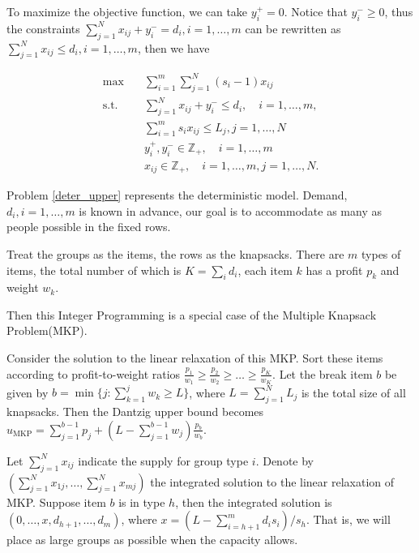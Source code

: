 To maximize the objective function, we can take $y_i^{+} = 0$. Notice that $y_{i}^{-} \geq 0$, thus the constraints $\sum_{j= 1}^{N} x_{ij} + y_{i}^{-} = d_{i}, i = 1,\ldots,m$ can be rewritten as $\sum_{j= 1}^{N} x_{ij} \leq d_{i}, i = 1,\ldots,m$, then we have

\begin{equation}\label{deter_upper}
  \begin{aligned}
  \max \quad & \sum_{i=1}^{m}  \sum_{j= 1}^{N} (s_i-1) x_{ij} \\
  \text {s.t.} \quad & \sum_{j= 1}^{N} x_{ij} + y_{i}^{-} \leq d_{i}, \quad i =1,\ldots,m, \\
  & \sum_{i=1}^{m} s_{i} x_{ij} \leq L_j, j =1,\ldots, N \\
  & y_{i}^{+}, y_{i}^{-} \in \mathbb{Z}_{+}, \quad i = 1,\ldots,m \\
  & x_{ij} \in \mathbb{Z}_{+}, \quad i=1,\ldots,m, j = 1,\ldots,N.
  \end{aligned}
\end{equation}

Problem \eqref{deter_upper} represents the deterministic model. Demand, $d_i, i = 1,\ldots,m$ is known in advance, our goal is to accommodate as many as people possible in the fixed rows.

Treat the groups as the items, the rows as the knapsacks. There are $m$ types of items, the total number of which is $K = \sum_{i} d_i$, each item $k$ has a profit $p_k$ and weight $w_k$. 


Then this Integer Programming is a special case of the Multiple Knapsack Problem(MKP). 

Consider the solution to the linear relaxation of this MKP. Sort these items according to profit-to-weight ratios $\frac{p_1}{w_1} \geq \frac{p_2}{w_2} \geq \ldots \geq \frac{p_K}{w_K}$.
Let the break item $b$ be given by $b=\min \{j: \sum_{k=1}^j w_k \geq L\}$, where $L = \sum_{j=1}^{N} L_j$ is the total size of all knapsacks. Then the Dantzig upper bound \cite{dantzig1957discrete} becomes 
$u_{\mathrm{MKP}}=\sum_{j=1}^{b-1} p_j+\left(L-\sum_{j=1}^{b-1} w_j\right) \frac{p_b}{w_b}$. 

Let $\sum_{j=1}^{N} x_{ij}$ indicate the supply for group type $i$. Denote by $(\sum_{j=1}^{N} x_{1j},\ldots, \sum_{j=1}^{N} x_{mj})$ the integrated solution to the linear relaxation of MKP.
Suppose item $b$ is in type $h$, then the integrated solution is $(0,\ldots, x,d_{h+1}, \ldots, d_{m})$, where $x = (L- \sum_{i = h+1}^{m} {d_i s_i})/ s_h$. That is, we will place as large groups as possible when the capacity allows.


